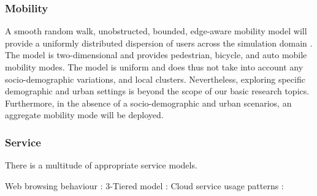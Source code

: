 \subsubsection{Mobility}
A smooth random walk, unobstructed, bounded, edge-aware mobility model will provide a uniformly distributed dispersion of users across the simulation domain \cite{Bettstetter:2001:SBS:381591.381600}. The model is two-dimensional and provides pedestrian, bicycle, and auto mobile mobility modes. The model is uniform and does thus not take into account any socio-demographic variations, and local clusters. Nevertheless, exploring specific demographic and urban settings is beyond the scope of our basic research topics. Furthermore, in the absence of a socio-demographic and urban scenarios, an aggregate mobility mode will be deployed.

\subsubsection{Service}
There is a multitude of appropriate service models. 

Web browsing behaviour : \cite{liu2010understanding}
3-Tiered model : \cite{1521145}
Cloud service usage patterns : \cite{zhao2009cloud}
